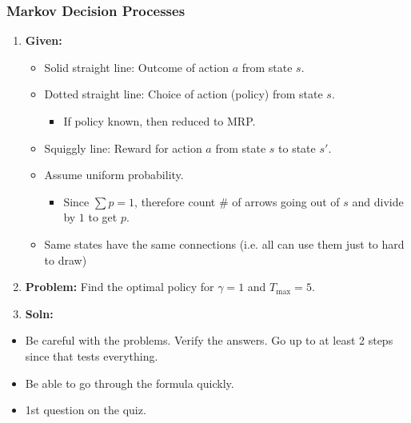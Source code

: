 \subsubsection{Markov Decision Processes}
\begin{example}
    \begin{enumerate}
        \item \textbf{Given:}
        \begin{itemize}
            \item Solid straight line: Outcome of action $a$ from state $s$.
            \item Dotted straight line: Choice of action (policy) from state $s$.
            \begin{itemize}
                \item If policy known, then reduced to MRP.
            \end{itemize}
            \item Squiggly line: Reward for action $a$ from state $s$ to state $s'$.
            \item Assume uniform probability. 
            \begin{itemize}
                \item Since $\sum p= 1$, therefore count \# of arrows going out of $s$ and divide by $1$ to get $p$.
            \end{itemize}
            \item Same states have the same connections (i.e. all can use them just to hard to draw)
        \end{itemize}
        \item \textbf{Problem:} Find the optimal policy for $\gamma=1$ and $T_{\max} = 5$.
        \item \textbf{Soln:}
    \end{enumerate}
\end{example}

\begin{warning}
    \begin{itemize}
        \item Be careful with the problems. Verify the answers. Go up to at least 2 steps since that tests everything.
        \item Be able to go through the formula quickly. 
        \item 1st question on the quiz.
    \end{itemize}
\end{warning}
\newpage

